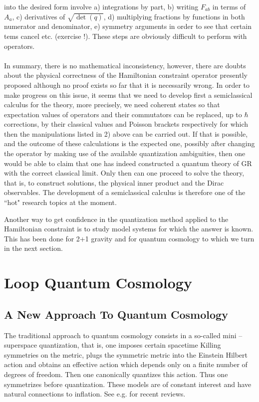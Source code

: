 \documentclass[12pt]{report}
\begin{document}
into the desired form involve a) integrations by part, b) writing 
$F_{ab}$ in terms of $A_a$, c) derivatives of $\sqrt{\det(q)}$, 
d) multiplying fractions by functions in both numerator and denominator,
e) symmetry arguments in order to see that certain tems cancel etc.
(exercise !). These steps are obviously difficult to perform with 
operators.\\
\\
In summary, there is no mathematical inconsistency, however, there are 
doubts about the physical correctness of the Hamiltonian constraint operator
presently proposed although no proof exists so far that it is 
necessarily wrong. In order to make progress on this issue, it seems 
that we need to develop first a semiclassical calculus for the theory,
more precisely, we need coherent states so that expectation values of 
operators and their commutators can be replaced, up to $\hbar$ 
corrections, by their classical values and Poisson brackets respectively
for which then the manipulations listed in 2) above can be carried out.
If that is possible, and the outcome of these calculations is the 
expected one, possibly after changing the operator by
making use of the available quantization ambiguities, 
then one would be able to claim that one has indeed 
constructed a quantum theory of GR with the correct classical limit.
Only then can one proceed to solve the theory, that is, to construct 
solutions, the physical inner product and the Dirac observables.
The development of a semiclassical calculus is therefore one of the 
``hot" research topics at the moment.

Another way to get confidence in the quantization method applied to the 
Hamiltonian constraint is to study model systems for which the answer is 
known. This has been done for 2+1 gravity \cite{41} and for quantum cosmology
to which we turn in the next section.



\section{Loop Quantum Cosmology}
\label{s3.2}

\subsection{A New Approach To Quantum Cosmology}
\label{s3.2.1}

The traditional approach to quantum cosmology consists in a so-called 
mini -- superspace quantization, that is, one imposes certain spacetime 
Killing symmetries on the metric, plugs the symmetric metric into the 
Einstein Hilbert action and obtains an effective action which depends 
only on a finite number of degrees of freedom. Then one canonically 
quantizes this action. Thus one symmetrizes before quantization. These 
models are of constant interest and have 
natural connections to inflation. See e.g. \cite{45} for recent reviews.
\end{document}
